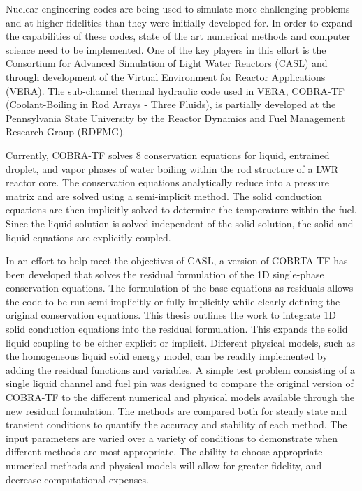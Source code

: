 Nuclear engineering codes  are being used to simulate more challenging problems
and at higher fidelities  than they were initially developed for. In order to
expand the capabilities of  these codes, state of the art numerical methods and
computer science need to be  implemented. One of the key players in this effort
is the Consortium for Advanced  Simulation of Light Water Reactors (CASL) and
through development of the  Virtual Environment for Reactor Applications (VERA).
The sub-channel thermal  hydraulic code used in VERA, COBRA-TF (Coolant-Boiling
in Rod Arrays - Three  Fluids), is partially developed at the Pennsylvania State
University by the Reactor  Dynamics and Fuel Management Research Group (RDFMG).

Currently, COBRA-TF solves 8 conservation equations for liquid, entrained
droplet, and vapor phases of  water boiling within the rod structure of a LWR
reactor core. The conservation  equations analytically reduce into a pressure
matrix and are solved using a  semi-implicit method. The solid conduction
equations are then implicitly  solved to determine the temperature within the
fuel. Since the liquid solution  is solved independent of the solid solution,
the solid and liquid equations are explicitly coupled.

In an effort to help meet the objectives of CASL,  a version of COBRTA-TF has
been developed that solves the residual formulation  of the 1D single-phase
conservation equations. The formulation of the base  equations as residuals
allows the code to be run semi-implicitly or fully  implicitly while clearly
defining the original conservation equations. This thesis outlines the work to
integrate 1D solid conduction equations into the  residual formulation. This
expands the solid liquid coupling to be either  explicit or implicit. Different
physical models, such as the homogeneous liquid  solid energy model, can be
readily implemented by adding the residual  functions and variables. A simple
test problem consisting of a single liquid  channel and fuel pin was designed to
compare the original version of COBRA-TF to  the different numerical and
physical models available through the new  residual formulation. The methods are
compared both for steady state and transient  conditions to quantify the
accuracy and stability of each method. The input  parameters are varied over a
variety of conditions to demonstrate when different  methods are most
appropriate. The ability to choose appropriate numerical  methods and physical
models will allow for greater fidelity, and decrease computational expenses.
